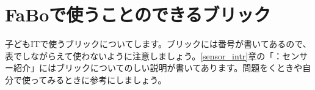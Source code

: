 \section{FaBoで使うことのできるブリック}
子どもITで使うブリックについてします。ブリックには番号が書いてあるので、表でしながらえて使わないように注意しましょう。\ref{sensor_intr}章の「：センサー紹介」にはブリックについてのしい説明が書いてあります。問題をくときや自分で使ってみるときに参考にしましょう。\\

\newlength{\colA}
\setlength{\colA}{0.15\columnwidth}
\newlength{\colB}
\setlength{\colB}{0.15\columnwidth}
\newlength{\colC}
\setlength{\colC}{0.3\columnwidth}
\newlength{\colD}
\setlength{\colD}{0.2\columnwidth}
\newlength{\colE}
\setlength{\colE}{0.07\columnwidth}


